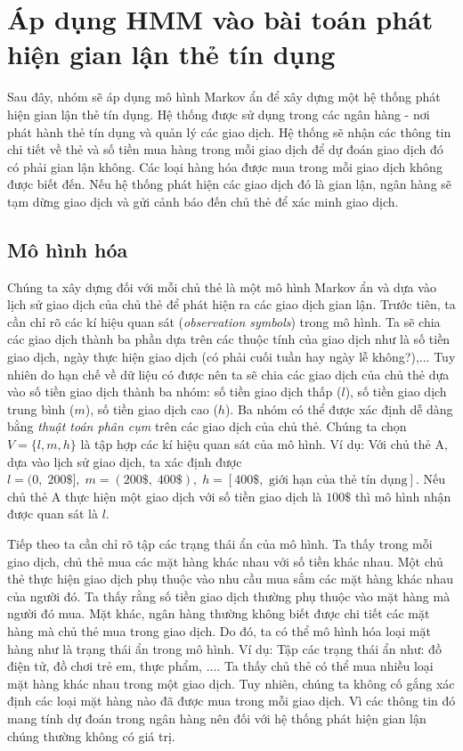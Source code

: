 \section{Áp dụng HMM vào bài toán phát hiện gian lận thẻ tín dụng}
Sau đây, nhóm sẽ áp dụng mô hình Markov ẩn để xây dựng một hệ thống phát hiện gian lận thẻ tín dụng. Hệ thống được sử dụng trong các ngân hàng - nơi phát hành thẻ tín dụng và quản lý các giao dịch. Hệ thống sẽ nhận các thông tin chi tiết về thẻ và số tiền mua hàng trong mỗi giao dịch để dự đoán giao dịch đó có phải gian lận không. Các loại hàng hóa được mua trong mỗi giao dịch không được biết đến. Nếu hệ thống phát hiện các giao dịch đó là gian lận, ngân hàng sẽ tạm dừng giao dịch và gửi cảnh báo đến chủ thẻ để xác minh giao dịch. 
\subsection{Mô hình hóa}
Chúng ta  xây dựng đối với mỗi chủ thẻ là một mô hình Markov ẩn và dựa vào lịch sử giao dịch của chủ thẻ để phát hiện ra các giao dịch gian lận. Trước tiên, ta cần chỉ rõ các kí hiệu quan sát (\textit{observation symbols}) trong mô hình. Ta sẽ chia các giao dịch thành ba phần dựa trên các thuộc tính của giao dịch như là số tiền giao dịch, ngày thực hiện giao dịch (có phải cuối tuần hay ngày lễ không?),... Tuy nhiên do hạn chế về dữ liệu có được nên ta sẽ chia các giao dịch của chủ thẻ dựa vào số tiền giao dịch thành ba nhóm: số tiền giao dịch thấp ($l$), số tiền giao dịch trung bình ($m$), số tiền giao dịch cao ($h$). Ba nhóm có thể được xác định dễ dàng bằng \textit{thuật toán phân cụm} trên các giao dịch của chủ thẻ. Chúng ta chọn $V = \{l, m, h\}$ là tập hợp các kí hiệu quan sát của mô hình. Ví dụ: Với chủ thẻ A, dựa vào lịch sử giao dịch, ta xác định được $l = (0,\; 200 \$ ], \; m = (200 \$ ,\; 400 \$ ),\; h = [400 \$ ,\text{ giới hạn của thẻ tín dụng}]$. Nếu chủ thẻ A thực hiện một giao dịch với số tiền giao dịch là $100 \$ $ thì mô hình nhận được quan sát là $l$. 


Tiếp theo ta cần chỉ rõ tập các trạng thái ẩn của mô hình. Ta thấy trong mỗi giao dịch, chủ thẻ mua các mặt hàng khác nhau với số tiền khác nhau. Một chủ thẻ thực hiện giao dịch phụ thuộc vào nhu cầu mua sắm các mặt hàng khác nhau của người đó. Ta thấy rằng số tiền giao dịch thường phụ thuộc vào mặt hàng mà người đó mua. Mặt khác, ngân hàng thường không biết được chi tiết các mặt hàng mà chủ thẻ mua trong giao dịch. Do đó, ta có thể mô hình hóa loại mặt hàng như là trạng thái ẩn trong mô hình. Ví dụ: Tập các trạng thái ẩn như: {đồ điện tử, đồ chơi trẻ em, thực phẩm, ...}. Ta thấy chủ thẻ có thể mua nhiều loại mặt hàng khác nhau trong một giao dịch. Tuy nhiên, chúng ta không cố gắng xác định các loại mặt hàng nào đã được mua trong mỗi giao dịch. Vì các thông tin đó mang tính dự đoán trong ngân hàng nên đối với hệ thống phát hiện gian lận chúng thường không có giá trị.

